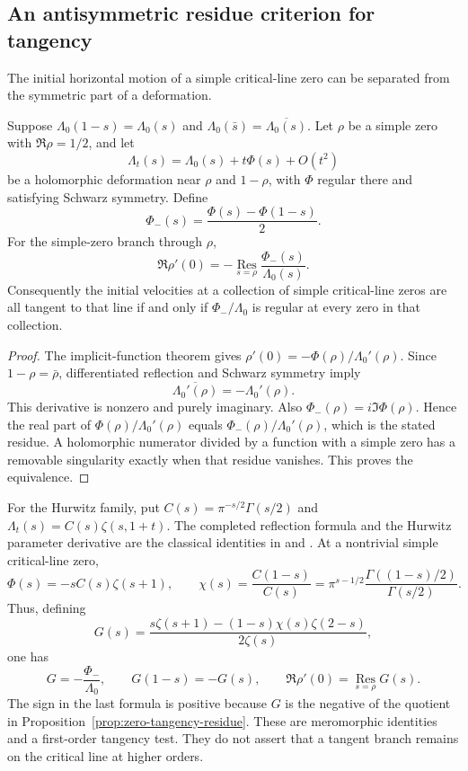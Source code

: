 \subsection{An antisymmetric residue criterion for tangency}\label{sec:zero-tangency}

The initial horizontal motion of a simple critical-line zero can be separated from the symmetric part of a deformation.

\begin{proposition}\label{prop:zero-tangency-residue}
Suppose $\Lambda_0(1-s)=\Lambda_0(s)$ and $\Lambda_0(\bar s)=\overline{\Lambda_0(s)}$. Let $\rho$ be a simple zero with $\Re\rho=1/2$, and let
\[
 \Lambda_t(s)=\Lambda_0(s)+t\Phi(s)+O(t^2)
\]
be a holomorphic deformation near $\rho$ and $1-\rho$, with $\Phi$ regular there and satisfying Schwarz symmetry. Define
\[
 \Phi_-(s)=\frac{\Phi(s)-\Phi(1-s)}2.
\]
For the simple-zero branch through $\rho$,
\[
 \Re\rho'(0)=-\operatorname*{Res}_{s=\rho}
                   \frac{\Phi_-(s)}{\Lambda_0(s)}.
\]
Consequently the initial velocities at a collection of simple critical-line zeros are all tangent to that line if and only if $\Phi_-/\Lambda_0$ is regular at every zero in that collection.
\end{proposition}

\begin{proof}
The implicit-function theorem gives $\rho'(0)=-\Phi(\rho)/\Lambda_0'(\rho)$. Since $1-\rho=\bar\rho$, differentiated reflection and Schwarz symmetry imply
\[
 \overline{\Lambda_0'(\rho)}=-\Lambda_0'(\rho).
\]
This derivative is nonzero and purely imaginary. Also $\Phi_-(\rho)=i\Im\Phi(\rho)$. Hence the real part of $\Phi(\rho)/\Lambda_0'(\rho)$ equals $\Phi_-(\rho)/\Lambda_0'(\rho)$, which is the stated residue. A holomorphic numerator divided by a function with a simple zero has a removable singularity exactly when that residue vanishes. This proves the equivalence.
\end{proof}

For the Hurwitz family, put $C(s)=\pi^{-s/2}\Gamma(s/2)$ and $\Lambda_t(s)=C(s)\zeta(s,1+t)$. The completed reflection formula and the Hurwitz parameter derivative are the classical identities in \citet[equations~25.4.3--25.4.4]{DLMFReflection} and \citet[equation~25.11.17]{DLMFShift}. At a nontrivial simple critical-line zero,
\[
 \Phi(s)=-sC(s)\zeta(s+1),\qquad
 \chi(s)=\frac{C(1-s)}{C(s)}
 =\pi^{s-1/2}\frac{\Gamma((1-s)/2)}{\Gamma(s/2)}.
\]
Thus, defining
\begin{equation}\label{eq:hurwitz-antisymmetric-G}
 G(s)=\frac{s\zeta(s+1)-(1-s)\chi(s)\zeta(2-s)}{2\zeta(s)},
\end{equation}
one has
\[
 G=-\frac{\Phi_-}{\Lambda_0},\qquad
 G(1-s)=-G(s),\qquad
 \Re\rho'(0)=\operatorname*{Res}_{s=\rho}G(s).
\]
The sign in the last formula is positive because $G$ is the negative of the quotient in Proposition~\ref{prop:zero-tangency-residue}. These are meromorphic identities and a first-order tangency test. They do not assert that a tangent branch remains on the critical line at higher orders.
